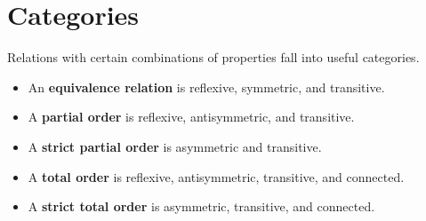 \documentclass{article}
\begin{document}
\section{Categories}

Relations with certain combinations of properties fall into useful categories.

\begin{itemize}
    \item An \textbf{equivalence relation} is reflexive, symmetric, and transitive.

    \item A \textbf{partial order} is reflexive, antisymmetric, and transitive.

    \item A \textbf{strict partial order} is asymmetric and transitive.

    \item A \textbf{total order} is reflexive, antisymmetric, transitive, and connected.

    \item A \textbf{strict total order} is asymmetric, transitive, and connected.
\end{itemize}
\end{document}
